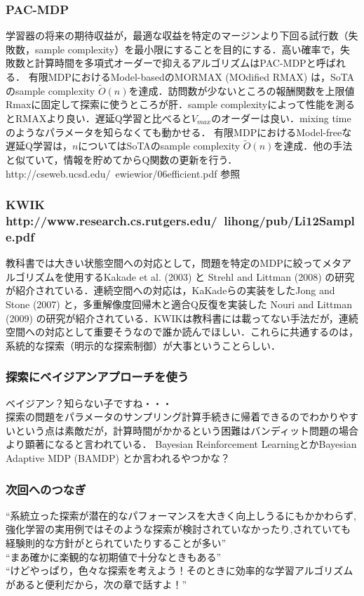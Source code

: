 \documentclass{jsarticle}
\begin{document}
\subsubsection*{PAC-MDP}
学習器の将来の期待収益が，最適な収益を特定のマージンより下回る試行数（失敗数，sample complexity）を最小限にすることを目的にする．高い確率で，失敗数と計算時間を多項式オーダーで抑えるアルゴリズムはPAC-MDPと呼ばれる．
有限MDPにおけるModel-basedのMORMAX (MOdified RMAX) は，SoTAのsample complexity $\tilde{O}(n)$を達成．訪問数が少ないところの報酬関数を上限値Rmaxに固定して探索に使うところが肝．sample complexityによって性能を測るとRMAXより良い．遅延Q学習と比べると$V_{max}$のオーダーは良い．mixing timeのようなパラメータを知らなくても動かせる．
有限MDPにおけるModel-freeな遅延Q学習は，$n$についてはSoTAのsample complexity $\tilde{O}(n)$を達成．他の手法と似ていて，情報を貯めてからQ関数の更新を行う．http://cseweb.ucsd.edu/~ewiewior/06efficient.pdf 参照
\subsubsection*{KWIK　http://www.research.cs.rutgers.edu/~lihong/pub/Li12Sample.pdf}
教科書では大きい状態空間への対応として，問題を特定のMDPに絞ってメタアルゴリズムを使用するKakade et al. (2003) と Strehl and Littman (2008) の研究が紹介されている．連続空間への対応は，KaKadeらの実装をしたJong and Stone (2007) と，多重解像度回帰木と適合Q反復を実装した Nouri and Littman (2009) の研究が紹介されている．KWIKは教科書には載ってない手法だが，連続空間への対応として重要そうなので誰か読んでほしい．これらに共通するのは，系統的な探索（明示的な探索制御）が大事ということらしい．

\subsubsection*{探索にベイジアンアプローチを使う}
ベイジアン？知らない子ですね・・・\\
探索の問題をパラメータのサンプリング計算手続きに帰着できるのでわかりやすいという点は素敵だが，計算時間がかかるという困難はバンディット問題の場合より顕著になると言われている． Bayesian Reinforcement LearningとかBayesian Adaptive MDP (BAMDP) とか言われるやつかな？

\subsubsection*{次回へのつなぎ}
``系統立った探索が潜在的なパフォーマンスを大きく向上しうるにもかかわらず,強化学習の実用例ではそのような探索が検討されていなかったり,されていても経験則的な方針がとられていたりすることが多い''\\
``まあ確かに楽観的な初期値で十分なときもある''\\
``けどやっぱり，色々な探索を考えよう！そのときに効率的な学習アルゴリズムがあると便利だから，次の章で話すよ！''
\end{document}
